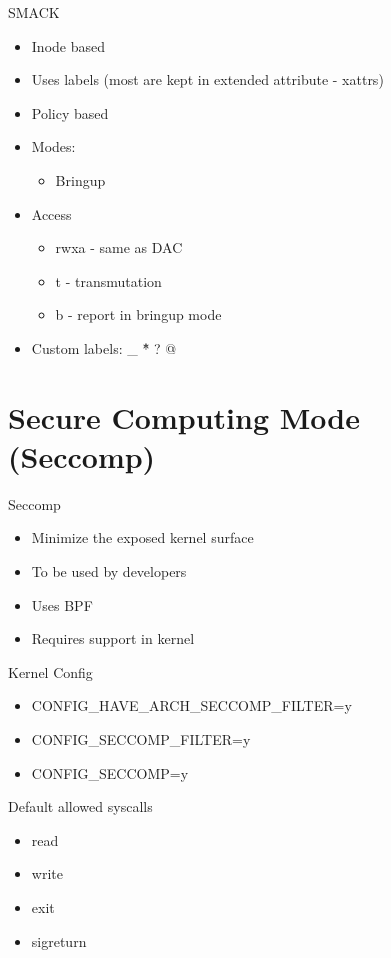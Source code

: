 \documentclass{curs}
\begin{document}
\begin{frame}{SMACK}
  \begin{itemize}
    \item Inode based
    \item Uses labels (most are kept in extended attribute - xattrs)
    \item Policy based
    \item Modes:
    \begin{itemize}
      \item Bringup
    \end{itemize}
    \item Access
    \begin{itemize}
      \item rwxa - same as DAC
      \item t - transmutation
      \item b - report in bringup mode
    \end{itemize}
    \item Custom labels: \_ \^ * ? @
  \end{itemize}
\end{frame}


\section{Secure Computing Mode (Seccomp)}

\begin{frame}{Seccomp}
  \begin{itemize}
    \item Minimize the exposed kernel surface
    \item To be used by developers
    \item Uses BPF
    \item Requires support in kernel
  \end{itemize}
\end{frame}

\begin{frame}{Kernel Config}
\begin{itemize}
  \item CONFIG_HAVE_ARCH_SECCOMP_FILTER=y
  \item CONFIG_SECCOMP_FILTER=y
  \item CONFIG_SECCOMP=y
\end{itemize}
\end{frame}

\begin{frame}{Default allowed syscalls}
  \begin{itemize}
      \item read
      \item write
      \item exit
      \item sigreturn
  \end{itemize}
\end{frame}
\end{document}
